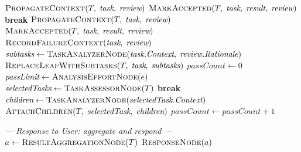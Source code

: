 \documentclass{article}
\begin{document}
\begin{algorithm}[t]
\begin{algorithmic}[1]
            \State $\textsc{PropagateContext}(T,\; \textit{task},\; \textit{review})$
            \State $\textsc{MarkAccepted}(T,\; \textit{task},\; \textit{result},\; \textit{review})$
            \State \textbf{break}
        \Else
            \State $\textsc{PropagateContext}(T,\; \textit{task},\; \textit{review})$
            \State $\textsc{MarkAccepted}(T,\; \textit{task},\; \textit{result},\; \textit{review})$
        \EndIf
        \State $\textsc{RecordFailureContext}(\textit{task},\; \textit{review})$
        \State $\textit{subtasks} \gets \textsc{TaskAnalyzerNode}(\textit{task.Context},\; \textit{review.Rationale})$
        \State $\textsc{ReplaceLeafWithSubtasks}(T,\; \textit{task},\; \textit{subtasks})$
        \State $\textit{passCount} \gets 0$
        \State $\textit{passLimit} \gets \textsc{AnalysisEffortNode}(e)$
            \State $\textit{selectedTasks} \gets \textsc{TaskAssessorNode}(T)$
                \State \textbf{break}
            \EndIf
                \State $\textit{children} \gets \textsc{TaskAnalyzerNode}(\textit{selectedTask.Context})$
                \State $\textsc{AttachChildren}(T,\; \textit{selectedTask},\; \textit{children})$
            \EndFor
            \State $\textit{passCount} \gets \textit{passCount} + 1$
        \EndWhile
    \EndIf
\EndWhile

\Statex \textit{--- Response to User: aggregate and respond ---}
\State $a \gets \textsc{ResultAggregationNode}(T)$
\State \Return $\textsc{ResponseNode}(a)$
\end{algorithmic}
\end{algorithm}
\end{document}
